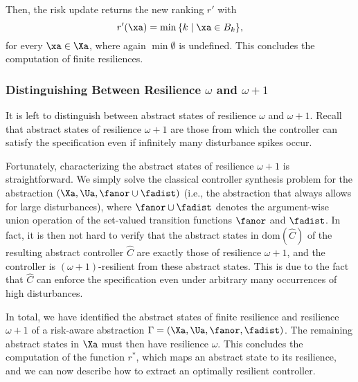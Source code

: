 Then, the risk update returns the new ranking $r'$ with
\[ r'(\xa) = \min{\{ k \mid \xa \in B_k \}}, \]
for every $\xa \in \Xa$, where again $\min{\emptyset}$ is undefined.
This concludes the computation of finite resiliences.


\subsubsection{Distinguishing Between Resilience $\omega$ and $\omega+1$}
It is left to distinguish between abstract states of resilience $\omega$ and $\omega + 1$.
Recall that abstract states of resilience $\omega + 1$ are those from which the controller can satisfy the specification even if infinitely many disturbance spikes occur.

Fortunately, characterizing the abstract states of resilience $\omega + 1$ is straightforward.
We simply solve the classical controller synthesis problem for the abstraction $(\Xa, \Ua, \fanor\cup \fadist)$ (i.e., the abstraction that always allows for large disturbances), where $\fanor\cup\fadist$ denotes the argument-wise union operation of the set-valued transition functions $\fanor$ and $\fadist$.
In fact, it is  then not hard to verify that the abstract states in $\mathrm{dom}(\widehat{C})$ of the resulting abstract controller $\widehat{C}$ are exactly those of resilience $\omega + 1$, and the controller is $(\omega + 1)$-resilient from these abstract states.
This is due to the fact that $\widehat{C}$ can enforce the specification even under arbitrary many occurrences of high disturbances.

In total, we have identified the abstract states of finite resilience and resilience $\omega + 1$ of a risk-aware abstraction $\Gamma = (\Xa, \Ua, \fanor, \fadist)$.
The remaining abstract states in $\Xa$ must then have resilience $\omega$.
This concludes the computation of the function $r^\ast$, which maps an abstract state to its resilience, and we can  now describe how to extract an optimally resilient controller. 


